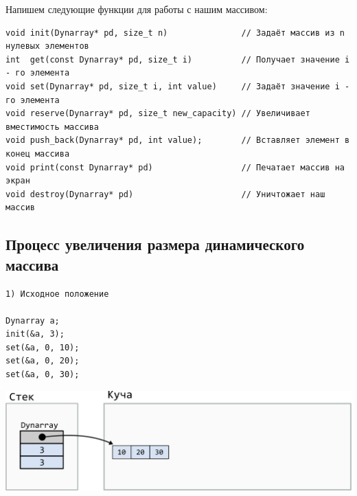 \documentclass{article}
\begin{document}
Напишем следующие функции для работы с нашим массивом:
\begin{lstlisting}
void init(Dynarray* pd, size_t n)               // Задаёт массив из n нулевых элементов
int  get(const Dynarray* pd, size_t i)          // Получает значение i - го элемента
void set(Dynarray* pd, size_t i, int value)     // Задаёт значение i - го элемента
void reserve(Dynarray* pd, size_t new_capacity) // Увеличивает вместимость массива
void push_back(Dynarray* pd, int value);        // Вставляет элемент в конец массива
void print(const Dynarray* pd)                  // Печатает массив на экран
void destroy(Dynarray* pd)                      // Уничтожает наш массив
\end{lstlisting}




\newpage
\subsection*{Процесс увеличения размера динамического массива}
\noindent\begin{minipage}{.40\textwidth}
\begin{lstlisting}
1) Исходное положение

Dynarray a;
init(&a, 3);
set(&a, 0, 10);
set(&a, 0, 20);
set(&a, 0, 30);
\end{lstlisting}
\end{minipage}
\begin{minipage}{.50\textwidth}
\includegraphics[scale=0.8]{../images/dynarray1.png}
\end{minipage}
\quad\\
\quad\\
\quad\\
\quad\\
\quad\\
\end{document}
